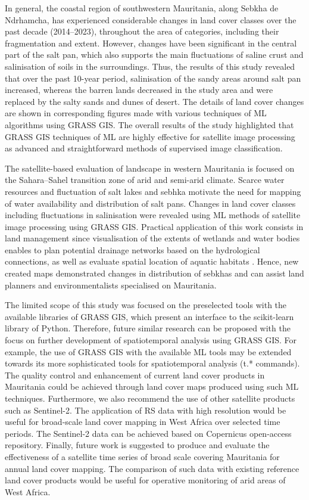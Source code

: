 \documentclass[12pt,a4paper,oneside]{article}
\def \newpar{\vspace{6pt}}
\begin{document}
\newpar In general, the coastal region of southwestern Mauritania, along Sebkha de Ndrhamcha, has experienced considerable changes in land cover classes over the past decade (2014–2023), throughout the area of categories, including their fragmentation and extent. However, changes have been significant in the central part of the salt pan, which also supports the main fluctuations of saline crust and salinisation of soils in the surroundings. Thus, the results of this study revealed that over the past 10-year period, salinisation of the sandy areas around salt pan increased, whereas the barren lands decreased in the study area and were replaced by the salty sands and dunes of desert. The details of land cover changes are shown in corresponding figures made with various techniques of ML algorithms using GRASS GIS. The overall results of the study highlighted that GRASS GIS techniques of ML are highly effective for satellite image processing as advanced and straightforward methods of supervised image classification.

\newpar The satellite-based evaluation of landscape in western Mauritania is focused on the Sahara–Sahel transition zone of arid and semi-arid climate. Scarce water resources and fluctuation of salt lakes and sebhka motivate the need for mapping of water availability and distribution of salt pans. Changes in land cover classes including fluctuations in salinisation were revealed using ML methods of satellite image processing using GRASS GIS. Practical application of this work consists in land management since visualisation of the extents of wetlands and water bodies enables to plan potential drainage networks based on the hydrological connections, as well as evaluate spatial location of aquatic habitats \cite{CAMPOS2012438}. Hence, new created maps demonstrated changes in distribution of sebkhas and can assist land planners and environmentalists specialised on Mauritania.

\newpar The limited scope of this study was focused on the preselected tools with the available libraries of GRASS GIS, which present an interface to the scikit-learn library of Python. Therefore, future similar research can be proposed with the focus on further development of spatiotemporal analysis using GRASS GIS. For example, the use of GRASS GIS with the available ML tools may be extended towards its more sophisticated tools for spatiotemporal analysis (t.* commands). The quality control and enhancement of current land cover products in Mauritania could be achieved through land cover maps produced using such ML techniques. Furthermore, we also recommend the use of other satellite products such as Sentinel-2. The application of RS data with high resolution would be useful for broad-scale land cover mapping in West Africa over selected time periods. The Sentinel-2 data can be achieved based on Copernicus open-access repository. Finally, future work is suggested to produce and evaluate the effectiveness of a satellite time series of broad scale covering Mauritania for annual land cover mapping. The comparison of such data with existing reference land cover products would be useful for operative monitoring of arid areas of West Africa.
\end{document}
